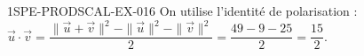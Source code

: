 \begin{corrige}{1SPE-PRODSCAL-EX-016}
On utilise l'identité de polarisation :
$\vec{u} \cdot \vec{v} = \dfrac{\|\vec{u} + \vec{v}\|^2 - \|\vec{u}\|^2 - \|\vec{v}\|^2}{2} = \dfrac{49 - 9 - 25}{2} = \dfrac{15}{2}$.
\end{corrige}
